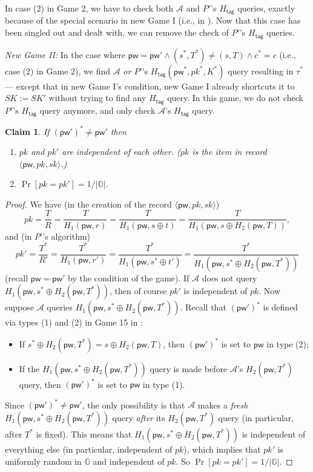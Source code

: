 \documentclass{article}
\theoremstyle{plain}
\newtheorem{claim}{Claim}
\theoremstyle{definition}
\theoremstyle{remark}
\newcommand{\group}{\mathbb{G}}
\newcommand{\adv}{\mathcal{A}}
\newcommand{\Htag}{H_\mathsf{tag}}
\newcommand{\pw}{\mathsf{pw}}
\begin{document}
In case (2) in Game 2, we have to check both $\adv$ and $P'$'s $\Htag$ queries, exactly because of the special scenario in new Game I (i.e., in ). Now that this case has been singled out and dealt with, we can remove the check of $P'$'s $\Htag$ queries.

{\color{blue}
\medskip
\noindent\emph{New Game II:} In the case where $\pw = \pw' \land (s^*,T^*) \neq (s,T) \land c^* = c$ (i.e., case (2) in Game 2), we find $\adv$ \emph{or $P'$}'s $\Htag(\pw^*,pk^*,K^*)$ query resulting in $\tau^*$ --- except that in new Game I's condition, new Game I already shortcuts it to $SK := SK'$ without trying to find any $\Htag$ query. In this game, we do not check $P'$'s $\Htag$ query anymore, and only check $\adv$'s $\Htag$ query.

\begin{claim}
\label{clm:pk-ind}
If $(\pw')^* \neq \pw'$ then
\begin{enumerate}
  \item $pk$ and $pk'$ are independent of each other. ($pk$ is the item in record $\langle\pw,pk,sk\rangle$.)
  \item $\Pr[pk = pk'] = 1/|\group|$.
\end{enumerate}
\end{claim}
\begin{proof}
We have (in the creation of the record $\langle\pw,pk,sk\rangle$)
\[
pk = \frac{T}{R} = \frac{T}{H_1(\pw,r)} = \frac{T}{H_1(\pw,s \oplus t)} = \frac{T}{H_1(\pw,s \oplus H_2(\pw,T))},
\]
and (in $P'$'s algorithm)
\[
pk' = \frac{T^*}{R'} = \frac{T^*}{H_1(\pw,r')} = \frac{T^*}{H_1(\pw,s^* \oplus t')} = \frac{T^*}{H_1(\pw,s^* \oplus H_2(\pw,T^*))}
\]
(recall $\pw = \pw'$ by the condition of the game). If $\adv$ does not query $H_1(\pw,s^* \oplus H_2(\pw,T^*))$, then of course $pk'$ is independent of $pk$. Now suppose $\adv$ queries $H_1(\pw,s^*\allowbreak\oplus H_2(\pw,T^*))$. Recall that $(\pw')^*$ is defined via types (1) and (2) in Game 15 in :
\begin{itemize}
  \item If $s^*\oplus H_2(\pw,T^*) = s \oplus H_2(\pw,T)$, then $(\pw')^*$ is set to $\pw$ in type (2);
  \item If the $H_1(\pw,s^*\allowbreak\oplus H_2(\pw,T^*))$ query is made before $\adv$'s $H_2(\pw,T^*)$ query, then $(\pw')^*$ is set to $\pw$ in type (1).
\end{itemize}
Since $(\pw')^* \neq \pw'$, the only possibility is that $\adv$ makes a \emph{fresh} $H_1(\pw,s^*\allowbreak\oplus H_2(\pw,T^*))$ query \emph{after} its $H_2(\pw,T^*)$ query (in particular, after $T^*$ is fixed). This means that $H_1(\pw,s^*\allowbreak\oplus H_2(\pw,T^*))$ is independent of everything else (in particular, independent of $pk$), which implies that $pk'$ is uniformly random in $\group$ and independent of $pk$. So $\Pr[pk = pk'] = 1/|\group|$.
\end{proof}

}
\end{document}
